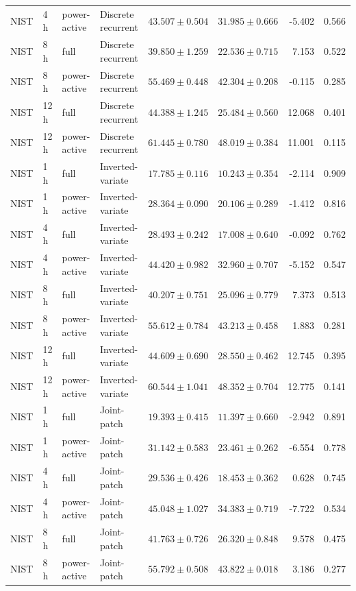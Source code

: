 \begin{longtable}{lll l rrrr}
NIST & 4 h & power-active & Discrete recurrent & $43.507\pm0.504$ & $31.985\pm0.666$ & -5.402 & 0.566\\
NIST & 8 h & full & Discrete recurrent & $39.850\pm1.259$ & $22.536\pm0.715$ & 7.153 & 0.522\\
NIST & 8 h & power-active & Discrete recurrent & $55.469\pm0.448$ & $42.304\pm0.208$ & -0.115 & 0.285\\
NIST & 12 h & full & Discrete recurrent & $44.388\pm1.245$ & $25.484\pm0.560$ & 12.068 & 0.401\\
NIST & 12 h & power-active & Discrete recurrent & $61.445\pm0.780$ & $48.019\pm0.384$ & 11.001 & 0.115\\
NIST & 1 h & full & Inverted-variate & $17.785\pm0.116$ & $10.243\pm0.354$ & -2.114 & 0.909\\
NIST & 1 h & power-active & Inverted-variate & $28.364\pm0.090$ & $20.106\pm0.289$ & -1.412 & 0.816\\
NIST & 4 h & full & Inverted-variate & $28.493\pm0.242$ & $17.008\pm0.640$ & -0.092 & 0.762\\
NIST & 4 h & power-active & Inverted-variate & $44.420\pm0.982$ & $32.960\pm0.707$ & -5.152 & 0.547\\
NIST & 8 h & full & Inverted-variate & $40.207\pm0.751$ & $25.096\pm0.779$ & 7.373 & 0.513\\
NIST & 8 h & power-active & Inverted-variate & $55.612\pm0.784$ & $43.213\pm0.458$ & 1.883 & 0.281\\
NIST & 12 h & full & Inverted-variate & $44.609\pm0.690$ & $28.550\pm0.462$ & 12.745 & 0.395\\
NIST & 12 h & power-active & Inverted-variate & $60.544\pm1.041$ & $48.352\pm0.704$ & 12.775 & 0.141\\
NIST & 1 h & full & Joint-patch & $19.393\pm0.415$ & $11.397\pm0.660$ & -2.942 & 0.891\\
NIST & 1 h & power-active & Joint-patch & $31.142\pm0.583$ & $23.461\pm0.262$ & -6.554 & 0.778\\
NIST & 4 h & full & Joint-patch & $29.536\pm0.426$ & $18.453\pm0.362$ & 0.628 & 0.745\\
NIST & 4 h & power-active & Joint-patch & $45.048\pm1.027$ & $34.383\pm0.719$ & -7.722 & 0.534\\
NIST & 8 h & full & Joint-patch & $41.763\pm0.726$ & $26.320\pm0.848$ & 9.578 & 0.475\\
NIST & 8 h & power-active & Joint-patch & $55.792\pm0.508$ & $43.822\pm0.018$ & 3.186 & 0.277\\

\end{longtable}
